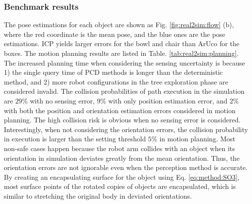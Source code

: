 \documentclass[conference]{IEEEtran}
\begin{document}
\subsubsection{Benchmark results} 
The pose estimations for each object are shown as Fig. \ref{fig:real2sim:flow} (b), where the red coordinate is the mean pose, and the blue ones are the pose estimations. ICP yields larger errors for the bowl and chair than ArUco for the boxes. The motion planning results are listed in Table. \ref{tab:real2sim:planning}. The increased planning time when considering the sensing uncertainty is because 1) the single query time of PCD methods is longer than the deterministic method, and 2) more robot configurations in the tree exploration phase are considered invalid. The collision probabilities of path execution in the simulation are $29\%$ with no sensing error, $9\%$ with only position estimation error, and $2\%$ with both the position and orientation estimation errors considered in motion planning. The high collision risk is obvious when no sensing error is considered. Interestingly, when not considering the orientation errors, the collision probability in execution is larger than the setting threshold $5\%$ in motion planning. Most non-safe cases happen because the robot arm collides with an object when its orientation in simulation deviates greatly from the mean orientation. Thus, the orientation errors are not ignorable even when the perception method is accurate. By creating an encapsulating surface for the object using Eq. \ref{eq:method:SO3}, most surface points of the rotated copies of objects are encapsulated, which is similar to stretching the original body in deviated orientations. 

\begin{table}[tb]
\caption{Motion planning results of the Real2Sim benchmark.}
\label{tab:real2sim:planning}
\end{table}
\end{document}
